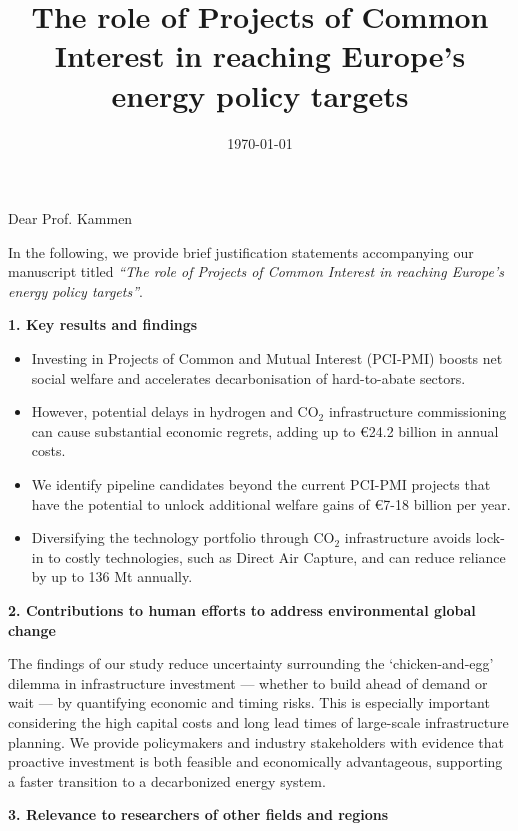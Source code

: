 \documentclass[10pt,a4paper,roman]{moderncv}        %
\title{The role of Projects of Common Interest in reaching Europe's energy policy targets}
\begin{document}
\date{\today}

\subject{Justification statement for manuscript submission\vspace{-0.6cm}}

\opening{Dear Prof. Kammen}
\makelettertitle
\justifying
In the following, we provide brief justification statements accompanying our manuscript titled \textit{\enquote{The role of Projects of Common Interest in reaching Europe's energy policy targets}}.

\textbf{1. Key results and findings} 
\begin{itemize}
    \item Investing in Projects of Common and Mutual Interest (PCI-PMI) boosts net social welfare and accelerates decarbonisation of hard-to-abate sectors.
    \item However, potential delays in hydrogen and CO$_2$ infrastructure commissioning can cause substantial economic regrets, adding up to €24.2 billion in annual costs.
    \item We identify pipeline candidates beyond the current PCI-PMI projects that have the potential to unlock additional welfare gains of €7-18 billion per year.
    \item Diversifying the technology portfolio through CO$_2$ infrastructure avoids lock-in to costly technologies, such as Direct Air Capture, and can reduce reliance by up to 136 Mt annually.
\end{itemize}

\textbf{2. Contributions to human efforts to address environmental global change} 

The findings of our study reduce uncertainty surrounding the `chicken-and-egg' dilemma in infrastructure investment --- whether to build ahead of demand or wait --- by quantifying economic and timing risks. This is especially important considering the high capital costs and long lead times of large-scale infrastructure planning. We provide policymakers and industry stakeholders with evidence that proactive investment is both feasible and economically advantageous, supporting a faster transition to a decarbonized energy system. 

\textbf{3. Relevance to researchers of other fields and regions}
\end{document}
